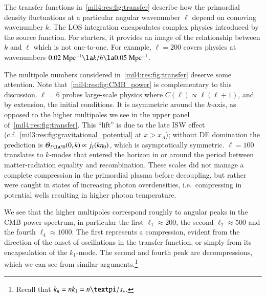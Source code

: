 



The transfer functions in~\cref{mil4:res:fig:transfer} describe how the primordial density fluctuations at a particular angular wavenumber $\ell$ depend on comoving wavenumber $k$. The LOS integration encapsulates complex physics introduced by the source function. For starters, it provides an image of the relationship between $k$ and $\ell$ which is not one-to-one. For example, $\ell=200$ covers physics at wavenumbers $0.02\unit{Mpc^{-1}} \la k/h \la 0.05\unit{Mpc^{-1}}$.

The multipole numbers considered in~\cref{mil4:res:fig:transfer} deserve some attention. Note that~\cref{mil4:res:fig:CMB_power} is complementary to this discussion. $\ell=6$ probes large-scale physics where $C(\ell) \propto \ell(\ell+1)$, and by extension, the initial conditions. It is asymmetric around the $k$-axis, as opposed to the higher multipoles we see in the upper panel of~\cref{mil4:res:fig:transfer}. This ``lift'' is due to the late ISW effect (c.f.~\cref{mil3:res:fig:gravitational_potential} at $x>x_\Lambda$); without DE domination the prediction is $\Theta_{\ell\la 30}(0, k)\propto j_\ell(k\eta_0)$, which is asymptotically symmetric. $\ell=100$ translates to $k$-modes that entered the horizon in or around the period between matter-radiation equality and recombination. These scales did not manage a complete compression in the primordial plasma before decoupling, but rather were caught in states of increasing photon overdensities, i.e.~compressing in potential wells resulting in higher photon temperature.  

We see that the higher multipoles correspond roughly to angular peaks in the CMB power spectrum, in particular the first $\ell_1 \approx 200$, the second $\ell_2 \approx 500$ and the fourth $\ell_4\approx 1000$. The first represents a compression, evident from the direction of the onset of oscillations in the transfer function, or simply from its encapsulation of the $k_1$-mode. The second and fourth peak are decompressions, which we can see from similar arguments.\footnote{Recall that $k_n=nk_1=n\pi/\sh$.} 



